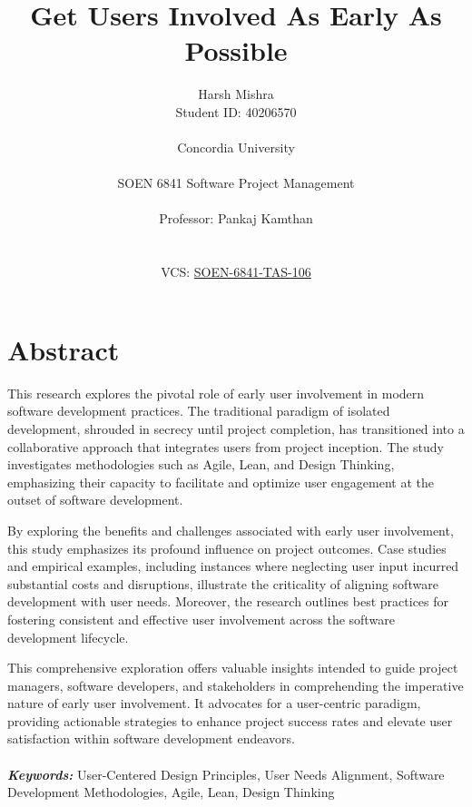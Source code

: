 \documentclass{article}
\begin{document}
\title{Get Users Involved As Early As Possible}
\author{ Harsh Mishra \\ Student ID: 40206570 \\ \\ Concordia University \\ \\ SOEN 6841 Software Project Management \\  \\ Professor: Pankaj Kamthan \\ \\ \\
VCS: \href{https://github.com/harsh2799/SONE-6841-TAS-106}{SOEN-6841-TAS-106}}

\date{}

\maketitle

\newpage

\tableofcontents

\newpage

\section{Abstract}
This research explores the pivotal role of early user involvement in modern software development practices. The traditional paradigm of isolated development, shrouded in secrecy until project completion, has transitioned into a collaborative approach that integrates users from project inception. The study investigates methodologies such as Agile, Lean, and Design Thinking, emphasizing their capacity to facilitate and optimize user engagement at the outset of software development.

By exploring the benefits and challenges associated with early user involvement, this study emphasizes its profound influence on project outcomes. Case studies and empirical examples, including instances where neglecting user input incurred substantial costs and disruptions, illustrate the criticality of aligning software development with user needs. Moreover, the research outlines best practices for fostering consistent and effective user involvement across the software development lifecycle.

This comprehensive exploration offers valuable insights intended to guide project managers, software developers, and stakeholders in comprehending the imperative nature of early user involvement. It advocates for a user-centric paradigm, providing actionable strategies to enhance project success rates and elevate user satisfaction within software development endeavors.
\\
\\
\textbf{\textit{Keywords:}} User-Centered Design Principles, User Needs Alignment, Software Development Methodologies, Agile, Lean, Design Thinking
\end{document}
